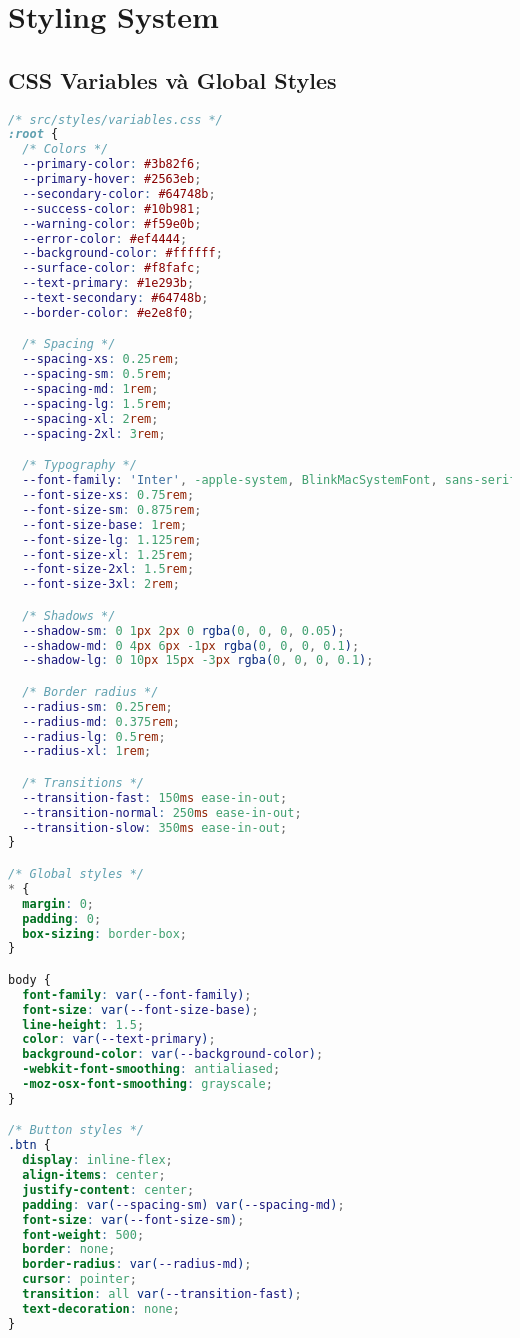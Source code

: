\documentclass[12pt,a4paper]{article}
\begin{document}
\section{Styling System}

\subsection{CSS Variables và Global Styles}
\begin{lstlisting}[language=CSS, caption=Global CSS Variables]
/* src/styles/variables.css */
:root {
  /* Colors */
  --primary-color: #3b82f6;
  --primary-hover: #2563eb;
  --secondary-color: #64748b;
  --success-color: #10b981;
  --warning-color: #f59e0b;
  --error-color: #ef4444;
  --background-color: #ffffff;
  --surface-color: #f8fafc;
  --text-primary: #1e293b;
  --text-secondary: #64748b;
  --border-color: #e2e8f0;

  /* Spacing */
  --spacing-xs: 0.25rem;
  --spacing-sm: 0.5rem;
  --spacing-md: 1rem;
  --spacing-lg: 1.5rem;
  --spacing-xl: 2rem;
  --spacing-2xl: 3rem;

  /* Typography */
  --font-family: 'Inter', -apple-system, BlinkMacSystemFont, sans-serif;
  --font-size-xs: 0.75rem;
  --font-size-sm: 0.875rem;
  --font-size-base: 1rem;
  --font-size-lg: 1.125rem;
  --font-size-xl: 1.25rem;
  --font-size-2xl: 1.5rem;
  --font-size-3xl: 2rem;

  /* Shadows */
  --shadow-sm: 0 1px 2px 0 rgba(0, 0, 0, 0.05);
  --shadow-md: 0 4px 6px -1px rgba(0, 0, 0, 0.1);
  --shadow-lg: 0 10px 15px -3px rgba(0, 0, 0, 0.1);

  /* Border radius */
  --radius-sm: 0.25rem;
  --radius-md: 0.375rem;
  --radius-lg: 0.5rem;
  --radius-xl: 1rem;

  /* Transitions */
  --transition-fast: 150ms ease-in-out;
  --transition-normal: 250ms ease-in-out;
  --transition-slow: 350ms ease-in-out;
}

/* Global styles */
* {
  margin: 0;
  padding: 0;
  box-sizing: border-box;
}

body {
  font-family: var(--font-family);
  font-size: var(--font-size-base);
  line-height: 1.5;
  color: var(--text-primary);
  background-color: var(--background-color);
  -webkit-font-smoothing: antialiased;
  -moz-osx-font-smoothing: grayscale;
}

/* Button styles */
.btn {
  display: inline-flex;
  align-items: center;
  justify-content: center;
  padding: var(--spacing-sm) var(--spacing-md);
  font-size: var(--font-size-sm);
  font-weight: 500;
  border: none;
  border-radius: var(--radius-md);
  cursor: pointer;
  transition: all var(--transition-fast);
  text-decoration: none;
}


\end{lstlisting}
\end{document}
